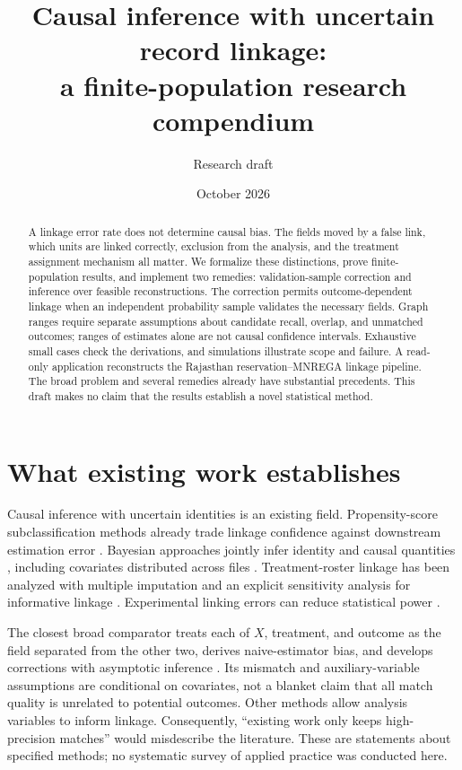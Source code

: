 \documentclass[11pt]{article}
\title{Causal inference with uncertain record linkage:\\a finite-population research compendium}
\author{Research draft}
\date{October 2026}
\begin{document}
\maketitle
\begin{abstract}
A linkage error rate does not determine causal bias. The fields moved by a false link,
which units are linked correctly, exclusion from the analysis, and the treatment
assignment mechanism all matter. We formalize these distinctions, prove finite-population
results, and implement two remedies: validation-sample correction and inference over
feasible reconstructions. The correction permits outcome-dependent linkage when an
independent probability sample validates the necessary fields. Graph ranges require
separate assumptions about candidate recall, overlap, and unmatched outcomes; ranges
of estimates alone are not causal confidence intervals. Exhaustive small cases check
the derivations, and simulations illustrate scope and failure. A read-only application
reconstructs the Rajasthan reservation--MNREGA linkage pipeline. The broad problem and
several remedies already have substantial precedents. This draft makes no claim that
the results establish a novel statistical method.
\end{abstract}

\section{What existing work establishes}
Causal inference with uncertain identities is an existing field. Propensity-score
subclassification methods already trade linkage confidence against downstream
estimation error \cite{wortman}. Bayesian approaches jointly infer identity and causal
quantities \cite{guha}, including covariates distributed across files \cite{guhax}.
Treatment-roster linkage has been analyzed with multiple imputation and an explicit
sensitivity analysis for informative linkage \cite{shan}. Experimental linking errors
can reduce statistical power \cite{tahamont}.

The closest broad comparator treats each of $X$, treatment, and outcome as the field
separated from the other two, derives naive-estimator bias, and develops corrections
with asymptotic inference \cite{slawski}. Its mismatch and auxiliary-variable assumptions
are conditional on covariates, not a blanket claim that all match quality is unrelated
to potential outcomes. Other methods allow analysis variables to inform linkage.
Consequently, ``existing work only keeps high-precision matches'' would misdescribe
the literature. These are statements about specified methods; no systematic survey of
applied practice was conducted here.
\end{document}
